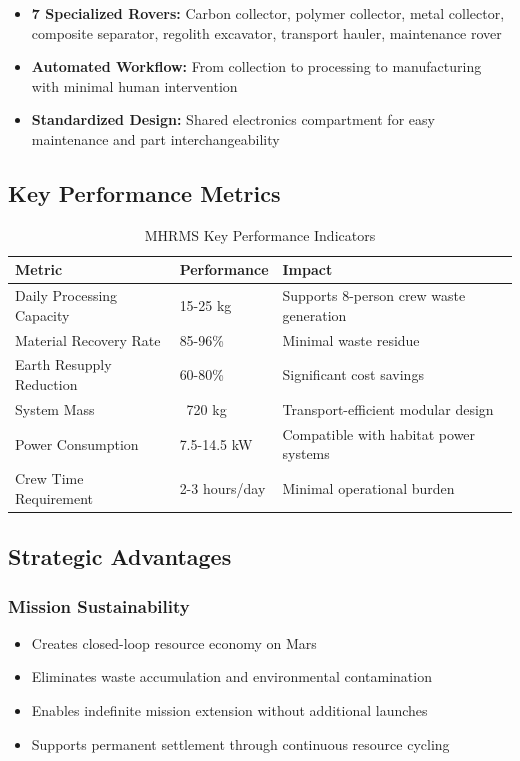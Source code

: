 \documentclass[12pt, a4paper]{article}
\begin{document}
\begin{itemize}
    \item \textbf{7 Specialized Rovers:} Carbon collector, polymer collector, metal collector, composite separator, regolith excavator, transport hauler, maintenance rover
    \item \textbf{Automated Workflow:} From collection to processing to manufacturing with minimal human intervention
    \item \textbf{Standardized Design:} Shared electronics compartment for easy maintenance and part interchangeability
\end{itemize}

\subsection{Key Performance Metrics}

\begin{table}[h!]
\centering
\small
\renewcommand{\arraystretch}{1.3}
\setlength{\tabcolsep}{10pt}
\begin{tabular}{p{} p{} p{}}
\toprule
\textbf{Metric} & \textbf{Performance} & \textbf{Impact} \\
\midrule
Daily Processing Capacity & 15-25 kg & Supports 8-person crew waste generation \\
Material Recovery Rate & 85-96\% & Minimal waste residue \\
Earth Resupply Reduction & 60-80\% & Significant cost savings \\
System Mass & ~720 kg & Transport-efficient modular design \\
Power Consumption & 7.5-14.5 kW & Compatible with habitat power systems \\
Crew Time Requirement & 2-3 hours/day & Minimal operational burden \\
\bottomrule
\end{tabular}
\caption{MHRMS Key Performance Indicators}
\end{table}
\normalsize

\subsection{Strategic Advantages}

\subsubsection{Mission Sustainability}
\begin{itemize}
    \item Creates closed-loop resource economy on Mars
    \item Eliminates waste accumulation and environmental contamination
    \item Enables indefinite mission extension without additional launches
    \item Supports permanent settlement through continuous resource cycling
\end{itemize}
\end{document}
